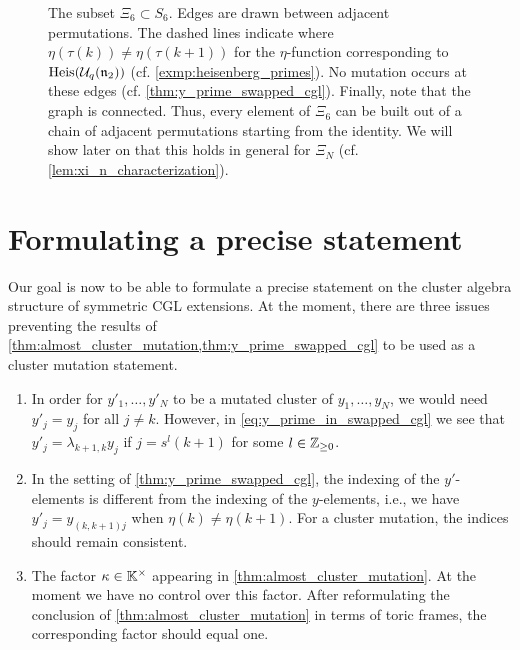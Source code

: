 \begin{figure}
	\caption{The subset $\Xi_6 \subset S_6$. Edges are drawn between adjacent permutations. The dashed lines indicate where $\eta(\tau(k)) \neq \eta(\tau(k+1))$ for the $\eta$-function corresponding to $\operatorname{Heis}(\mathcal{U}_q(\mathfrak{n}_2))$ (cf. \cref{exmp:heisenberg_primes}). No mutation occurs at these edges (cf. \cref{thm:y_prime_swapped_cgl}). Finally, note that the graph is connected. Thus, every element of $\Xi_6$ can be built out of a chain of adjacent permutations starting from the identity. We will show later on that this holds in general for $\Xi_N$ (cf. \cref{lem:xi_n_characterization}).}
	\label{fig:xi_6_graph}
\end{figure}

\section{Formulating a precise statement}\label{sec:formulating_theorem}

Our goal is now to be able to formulate a precise statement on the cluster algebra
structure of symmetric CGL extensions. At the moment, there are three issues preventing
the results of \cref{thm:almost_cluster_mutation,thm:y_prime_swapped_cgl} to be used as
a cluster mutation statement.

\begin{enumerate}
	\item In order for $y'_1, \dots, y'_N$ to be a mutated cluster of $y_1, \dots, y_N$, we would
	      need $y'_j = y_j$ for all $j \neq k$. However, in \cref{eq:y_prime_in_swapped_cgl} we
	      see that $y'_j = \lambda_{k+1,k}y_j$ if $j = s^l(k+1)$ for some $l \in \mathbb{Z}_{\geq 0}$.
	\item In the setting of \cref{thm:y_prime_swapped_cgl}, the indexing of the $y'$-elements is
	      different from the indexing of the $y$-elements, i.e., we have $y'_j = y_{(k,k+1)j}$
	      when $\eta(k) \neq \eta(k+1)$. For a cluster mutation, the indices should remain
	      consistent.
	\item The factor $\kappa \in \mathbb{K}^\times$ appearing in \cref{thm:almost_cluster_mutation}. At
	      the moment we have no control over this factor. After reformulating the conclusion of
	      \cref{thm:almost_cluster_mutation} in terms of toric frames, the corresponding factor
	      should equal one.
\end{enumerate}

